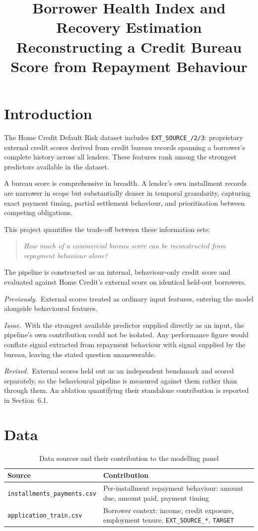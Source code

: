 \documentclass[11pt,a4paper]{article}
\title{Borrower Health Index and Recovery Estimation\\
\large Reconstructing a Credit Bureau Score from Repayment Behaviour}
\author{}
\date{}
\newcommand{\designnote}[3]{%
  \par\vspace{7pt}
  \begin{list}{}{%
    \setlength{\leftmargin}{2em}\setlength{\rightmargin}{1em}%
    \setlength{\labelwidth}{0pt}\setlength{\labelsep}{0pt}%
    \setlength{\itemsep}{2pt}\setlength{\topsep}{0pt}%
    \setlength{\parsep}{0pt}}
    \item[]\textit{Previously.}~#1
    \item[]\textit{Issue.}~#2
    \item[]\textit{Revised.}~#3
  \end{list}
  \par\vspace{7pt}
}
\begin{document}
\maketitle

\section{Introduction}

The Home Credit Default Risk dataset includes \texttt{EXT\_SOURCE\_/2/3}: proprietary
external credit scores derived from credit bureau records spanning a borrower's complete
history across all lenders. These features rank among the strongest predictors available
in the dataset.

A bureau score is comprehensive in breadth. A lender's own installment records are
narrower in scope but substantially denser in temporal granularity, capturing exact
payment timing, partial settlement behaviour, and prioritisation between competing
obligations.

This project quantifies the trade-off between these information sets:

\begin{quote}
\textit{How much of a commercial bureau score can be reconstructed from repayment
behaviour alone?}
\end{quote}

The pipeline is constructed as an internal, behaviour-only credit score and evaluated
against Home Credit's external score on identical held-out borrowers.

\designnote{External scores treated as ordinary input features, entering the model
alongside behavioural features.}
{With the strongest available predictor supplied directly as an input, the pipeline's own
contribution could not be isolated. Any performance figure would conflate signal
extracted from repayment behaviour with signal supplied by the bureau, leaving the stated
question unanswerable.}
{External scores held out as an independent benchmark and scored separately, so the
behavioural pipeline is measured against them rather than through them. An ablation
quantifying their standalone contribution is reported in Section~6.1.}

\section{Data}

\begin{table}[H]
\centering
\caption{Data sources and their contribution to the modelling panel}
\begin{tabular}{p{}p{}}
\toprule
\textbf{Source} & \textbf{Contribution} \\
\midrule
\texttt{installments\_\allowbreak payments.csv} & Per-installment repayment behaviour: amount
due, amount paid, payment timing \\
\addlinespace
\texttt{application\_train.csv} & Borrower context: income, credit exposure, employment
tenure, \texttt{EXT\_SOURCE\_*}, \texttt{TARGET} \\
\bottomrule
\end{tabular}
\end{table}
\end{document}
